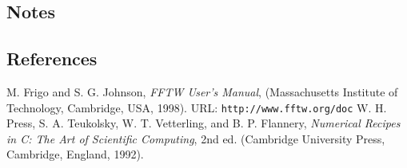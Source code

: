\documentclass{article}
\begin{document}

\subsection{Notes}

\subsection{References}

\begin{thebibliography}{0}
  M. Frigo and S. G. Johnson,
  \textit{FFTW User's Manual},
  (Massachusetts Institute of Technology, Cambridge, USA, 1998).
  URL: \texttt{http://www.fftw.org/doc}
  W. H. Press, S. A. Teukolsky, W. T. Vetterling, and B. P. Flannery,
  \textit{Numerical Recipes in C: The Art of Scientific Computing}, 2nd ed.
  (Cambridge University Press, Cambridge, England, 1992).
\end{thebibliography}
\end{document}
